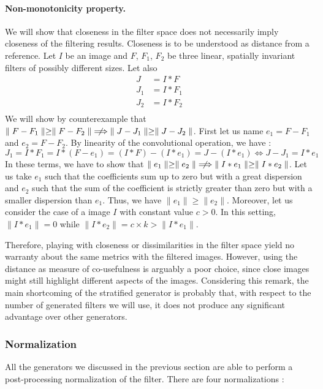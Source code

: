 \documentclass[a4paper]{report}
\begin{document}
			\paragraph{Non-monotonicity property.}
			We will show that closeness in the filter space does not necessarily imply closeness of the filtering results. Closeness is to be understood as distance from a reference.
			Let $I$ be an image and $F$, $F_1$, $F_2$ be three linear, spatially invariant filters of possibly different sizes. Let also
			\begin{align*}
				J &= I * F \\
				J_1 &= I * F_1 \\
				J_2 &= I * F_2 \\
			\end{align*}
			We will show by counterexample that $\parallel F - F_1 \parallel \geq \parallel F - F_2 \parallel \centernot\implies \parallel J - J_1 \parallel \geq \parallel J - J_2 \parallel$.
			First let us name $e_1 = F - F_1$ and $e_2 = F - F_2$. By linearity of the convolutional operation, we have :
			\[
				J_1 = I * F_1 =  I * (F - e_1) = (I * F) - (I * e_1) = J - (I * e_1)
				\iff
				J - J_1 = I * e_1
			\]
			In these terms, we have to show that $\parallel e_1 \parallel \geq \parallel e_2 \parallel \centernot\implies \parallel I * e_1 \parallel \geq \parallel I * e_2 \parallel$. 
			Let us take $e_1$ such that the coefficients sum up to zero but with a great dispersion and $e_2$ such that the sum of the coefficient is strictly greater than zero but with a smaller dispersion than $e_1$. Thus, we have  $\parallel e_1 \parallel \geq \parallel e_2 \parallel$. Moreover, let us consider the case of a image $I$ with constant value $c > 0$. In this setting, $\parallel I * e_1 \parallel = 0$ while $\parallel I * e_2 \parallel = c \times k > \parallel I * e_1 \parallel$.
			\par
			Therefore, playing with closeness or dissimilarities in the filter space yield no warranty about the same metrics with the filtered images. However, using the distance as measure of co-usefulness is arguably a poor choice, since close images might still highlight different aspects of the images. Considering this remark, the main shortcoming of the stratified generator is probably that, with respect to the number of generated filters we will use, it  does not produce any significant advantage over other generators.
			
			

			
			\subsubsection{Normalization}
			All the generators we discussed in the previous section are able to perform a post-processing normalization of the filter. There are four normalizations :
			
\end{document}
